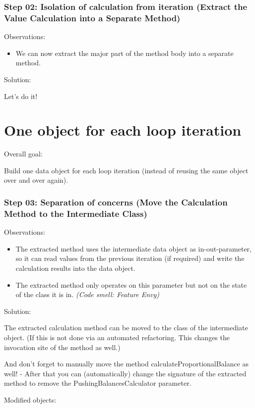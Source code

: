 \documentclass[a4paper,fleqn,titlepage,11pt]{article}
\begin{document}
\section*{Step 02: Isolation of calculation from iteration (Extract the Value Calculation into a Separate Method)}

Observations:
\begin{itemize}
\item We can now extract the major part of the method body into a separate method.
\end{itemize}

Solution:

Let's do it!

\part{One object for each loop iteration}

Overall goal:

Build one data object for each loop iteration (instead of reusing the same object over and over again).


\section*{Step 03: Separation of concerns (Move the Calculation Method to the Intermediate Class)}

Observations:
\begin{itemize}
\item The extracted method uses the intermediate data object as in-out-parameter, so it can read values from the previous iteration (if required) and write the calculation results into the data object.
\item The extracted method only operates on this parameter but not on the state of the class it is in. {\em (Code smell: Feature Envy)}
\end{itemize}

Solution:

The extracted calculation method can be moved to the class of the intermediate object. (If this is not done via an automated refactoring. This changes the invocation site of the method as well.)

And don't forget to manually move the method calculateProportionalBalance as well! - After that you can (automatically) change the signature of the extracted method to remove the PushingBalancesCalculator parameter.

Modified objects:
\end{document}
